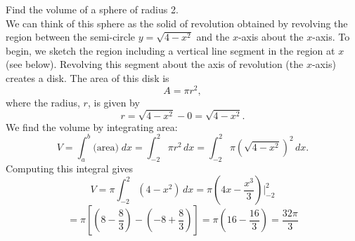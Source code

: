\documentclass[handout]{ximera}
\begin{document}
\begin{example}[example 2]
Find the volume of a sphere of radius 2.\\
We can think of this sphere as the solid of revolution obtained by revolving the region between 
the semi-circle $y = \sqrt{4-x^2}$ and the $x$-axis about the $x$-axis.
To begin, we sketch the region  including a vertical line segment in the region at $x$ (see below). 
Revolving this segment about the axis of revolution (the $x$-axis) creates a disk.  The area of this disk is
\[
A = \pi r^2,
\]
where the radius, $r$, is given by
\[
r = \sqrt{4 - x^2} - 0 = \sqrt{4-x^2}.
\]
We find the volume by integrating area:
\[
V = \int_a^b \text{(area)} \; dx = \int_{-2}^2 \pi r^2 \, dx = \int_{-2}^2 \pi \left(\sqrt{4-x^2}\right)^2 \, dx.
\]
Computing this integral gives
\[
V = \pi \int_{-2}^2 (4 - x^2) \, dx = \pi \left(4x - \frac{x^3}{3}\right) \bigg |_{-2}^2 
\]
\[
= \pi \left[\left(8 - \frac83 \right) - \left(-8 + \frac83\right)\right] = \pi \left(16 - \frac{16}{3}\right)
= \frac{32 \pi}{3}
\]


\begin{image}
\end{image}




\end{example}
\end{document}
